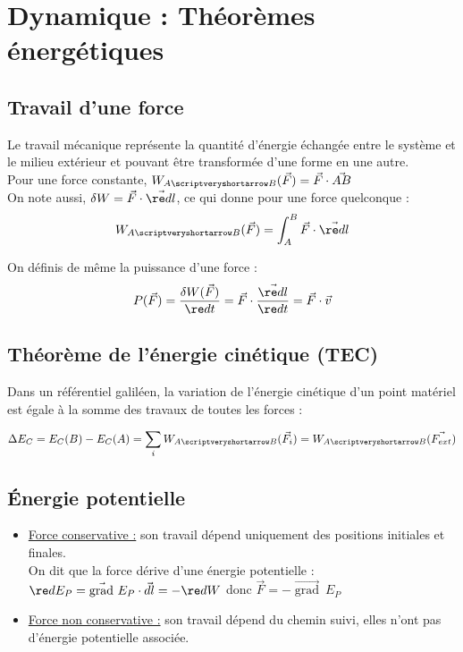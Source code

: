 \documentclass[13pt, twoside, a4paper, french]{report}
\begin{document}
\chapter{Dynamique : Théorèmes énergétiques}\label{ch:dynamique-theoremes-energetiques}
    
    
    \section{Travail d’une force}\label{sec:travail-dune-force}
        
        Le travail mécanique représente la quantité d’énergie échangée entre le système et le milieu extérieur et pouvant être transformée d’une forme en une autre.\\
        
        Pour une force constante, $W_{A\scriptveryshortarrow B}(\vec F) = \vec F \cdot \vec{AB}$\\
        
        On note aussi, $\delta W = \vec F \cdot \vec{\re d l}$, ce qui donne pour une force quelconque :\\
        \[ W_{A\scriptveryshortarrow B}(\vec F) = \int_A^B \vec F \cdot \vec{\re dl} \]
        
        On définis de même la puissance d'une force :\\
        \[ P(\vec F) = \dfrac{\delta W(\vec F)}{\re d t} = \vec F \cdot \dfrac{\vec{\re d l}}{\re dt} = \vec F \cdot \vec v \]
    
    
    \section{Théorème de l'énergie cinétique (TEC)}\label{sec:theoreme-de-l'energie-cinetique-(tec)}
        
        Dans un référentiel galiléen, la variation de l'énergie cinétique d'un point matériel est égale à la somme des travaux de toutes les forces :
        
        \[\Delta E_C = E_C(B) - E_C(A) = \sum_i W_{A \scriptveryshortarrow B}(\vec{F_i}) = W_{A \scriptveryshortarrow B}(\vec{F_{ext}})\]
    
    
    \section{Énergie potentielle}\label{sec:energie-potentielle}
        
        
        \begin{itemize}
            \item \underline{Force conservative :} son travail dépend uniquement des positions initiales et finales.\\
            On dit que la force dérive d'une énergie potentielle : $\re d E_P = \vec{\operatorname{grad}}\ E_P \cdot \vec{d l} = -\re d W$ donc $\vec F = - \vec{\operatorname{grad}}\ E_P$\\
            \item \underline{Force non conservative :} son travail dépend du chemin suivi, elles n'ont pas d'énergie potentielle associée.
        \end{itemize}
    
\end{document}
